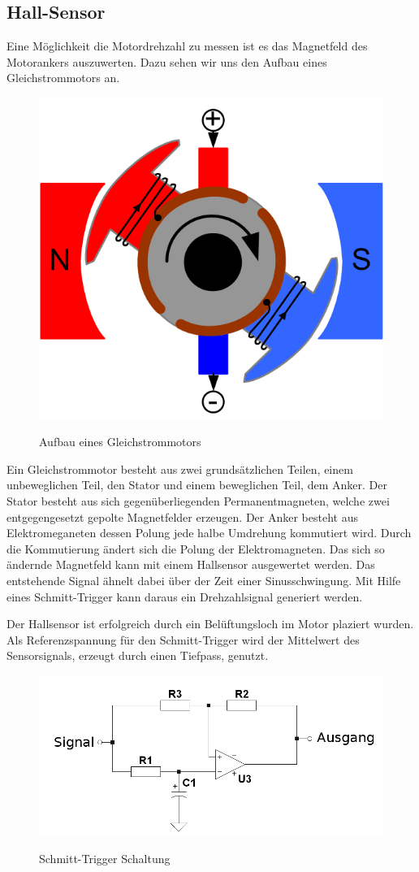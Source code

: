 \subsection{Hall-Sensor}
Eine Möglichkeit die Motordrehzahl zu messen ist es das Magnetfeld des
Motorankers auszuwerten. Dazu sehen wir uns den Aufbau eines Gleichstrommotors an.
\begin{figure}[H]
\centering
\includegraphics[width=.5\textwidth]{motor.png}\\
\caption{Aufbau eines Gleichstrommotors \cite{gs-motor}}%
\label{fig:aufbau_motor}
\end{figure}
Ein Gleichstrommotor besteht aus zwei grundsätzlichen Teilen, einem unbeweglichen Teil, den Stator und einem beweglichen Teil, dem Anker.
Der Stator besteht aus sich gegenüberliegenden Permanentmagneten, welche zwei entgegengesetzt gepolte Magnetfelder erzeugen.
Der Anker besteht aus Elektromeganeten dessen Polung jede halbe Umdrehung kommutiert wird. Durch die Kommutierung ändert sich die 
Polung der Elektromagneten. Das sich so ändernde Magnetfeld kann mit einem Hallsensor ausgewertet werden. Das entstehende 
Signal ähnelt dabei über der Zeit einer Sinusschwingung. Mit Hilfe eines Schmitt-Trigger kann daraus ein Drehzahlsignal generiert werden.

Der Hallsensor ist erfolgreich durch ein Belüftungsloch im Motor plaziert wurden. Als Referenzspannung für den Schmitt-Trigger wird der
Mittelwert des Sensorsignals, erzeugt durch einen Tiefpass, genutzt.

\begin{figure}[H]
\centering
\includegraphics[width=.5\textwidth]{schmitt.png}\\
\caption{Schmitt-Trigger Schaltung}%
\label{fig:schmitt}
\end{figure}

